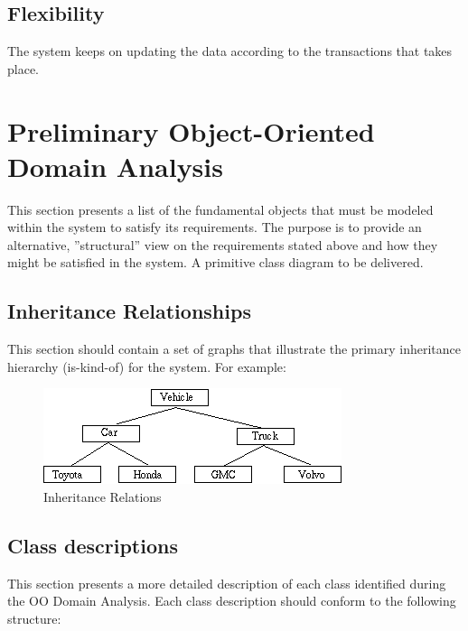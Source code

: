 \documentclass[]{article}
\begin{document}
\subsection {Flexibility}
The system keeps on updating the data according to the transactions that takes place.

\section{Preliminary Object-Oriented Domain Analysis}
This section presents a list of the fundamental objects that must be modeled within the system to satisfy its requirements. The purpose is to provide an alternative, ''structural'' view on the requirements stated above and how they might be satisfied in the system. A primitive class diagram to be delivered.

\subsection{Inheritance Relationships}
This section should contain a set of graphs that illustrate the primary inheritance hierarchy (is-kind-of) for the system. For example: 

\begin{figure}[tbh]
\centering
\includegraphics[width=0.7\linewidth]{./image}
\caption{Inheritance Relations}
\label{fig:image}
\end{figure}

\subsection{Class descriptions}
This section presents a more detailed description of each class identified during the OO Domain Analysis.
Each class description should conform to the following structure: 
\end{document}
